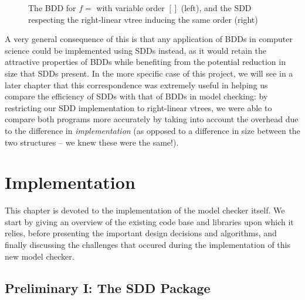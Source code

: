 \documentclass[11pt]{article}
\begin{document}
\begin{figure}



\caption{The BDD for $f = $ with variable order $[]$ (left), and the SDD respecting the right-linear vtree inducing the same order (right)}
\label{fig:bdds_are_sdds}
\end{figure}

A very general consequence of this is that any application of BDDs in computer science could be implemented using SDDs instead, as it would retain the attractive properties of BDDs while benefiting from the potential reduction in size that SDDs present. In the more specific case of this project, we will see in a later chapter that this correspondence was extremely useful in helping us compare the efficiency of SDDs with that of BDDs in model checking: by restricting our SDD implementation to right-linear vtrees, we were able to compare both programs more accurately by taking into account the overhead due to the difference in \textit{implementation} (as opposed to a difference in size between the two structures -- we knew these were the same!).


\section{Implementation}

This chapter is devoted to the implementation of the model checker itself. We start by giving an overview of the existing code base and libraries upon which it relies, before presenting the important design decisions and algorithms, and finally discussing the challenges that occured during the implementation of this new model checker. 

\subsection{Preliminary I: The SDD Package}
\end{document}

